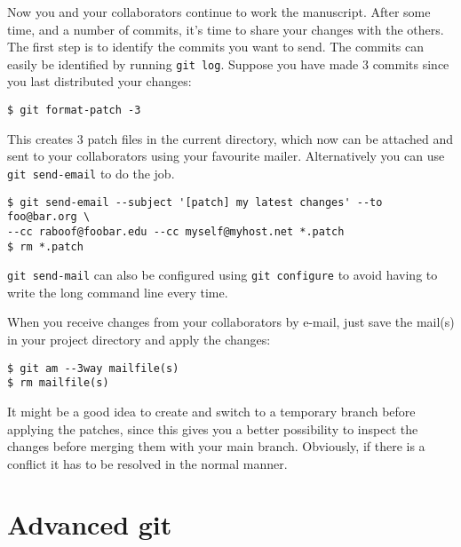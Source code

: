\documentclass[a4paper,10pt]{article}
\begin{document}
Now you and your collaborators continue to work the manuscript. After some
time, and a number of commits, it's time to share your changes with the 
others. The first step is to identify the commits you want to send. The
commits can easily be identified by running \texttt{git log}. Suppose you have
made 3 commits since you last distributed your changes:
\begin{verbatim}
$ git format-patch -3
\end{verbatim}
This creates 3 patch files in the current directory, which now can be attached
and sent to your collaborators using your favourite mailer. Alternatively you
can use \texttt{git send-email} to do the job.
\begin{verbatim}
$ git send-email --subject '[patch] my latest changes' --to foo@bar.org \
--cc raboof@foobar.edu --cc myself@myhost.net *.patch
$ rm *.patch
\end{verbatim}
\texttt{git send-mail} can also be configured using \texttt{git configure} to
avoid having to write the long command line every time.

When you receive changes from your collaborators by e-mail, just save the
mail(s) in your project directory and apply the changes:
\begin{verbatim}
$ git am --3way mailfile(s)
$ rm mailfile(s)
\end{verbatim}
It might be a good idea to create and switch to a temporary branch before 
applying the patches, since this gives you a better possibility to inspect the 
changes before merging them with your main branch. Obviously, if there is a
conflict it has to be resolved in the normal manner.

\section{Advanced git}
\end{document}
